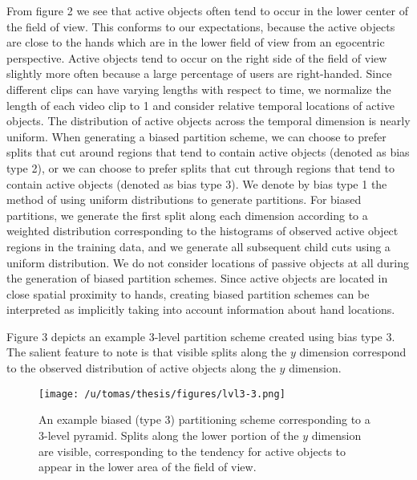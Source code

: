 \documentclass{bmvc2k}
\begin{document}
	From figure 2 we see that active objects often tend to occur in the lower center
	of the field of view. This conforms to our expectations, because
	the active objects are close to the hands which are in the lower field of
	view from an egocentric perspective. Active objects tend to occur on the
  right side of the field of view slightly more often because a large
  percentage of users are right-handed. Since different clips can have
  varying lengths with respect to time, we normalize the length of each
  video clip to 1 and consider relative temporal locations of active
  objects. The distribution of active objects
  across the temporal dimension is nearly uniform. When generating a biased
	partition scheme, we can choose to prefer splits that cut around regions that tend to
	contain active objects (denoted as bias type 2), or we can choose to prefer 
	splits that cut through regions that tend to contain active objects (denoted as bias type 3). 
	We denote by bias type 1 the method of using uniform
	distributions to generate partitions. For biased partitions, we generate
  the first split along each dimension according to a weighted distribution
  corresponding to the histograms of observed active object regions in the training data,
  and we generate all subsequent child cuts using a uniform distribution.
  We do not consider locations of passive objects at all during the
  generation of biased partition schemes. Since active objects are located
  in close spatial proximity to hands, creating biased partition schemes can
  be interpreted as implicitly taking into account information about hand
  locations.
  
  Figure 3 depicts an example 3-level partition scheme created using bias
  type 3. The salient feature to note is that visible splits along the $y$
  dimension correspond to the observed distribution of active objects along
  the $y$ dimension.
  

  \begin{figure}[t]
    \begin{center}
		 \texttt{[image: /u/tomas/thesis/figures/lvl3-3.png]}
    \end{center}
		   \caption{An example biased (type 3) partitioning scheme corresponding to a 3-level
       pyramid. Splits along the lower portion of the $y$ dimension are
     visible, corresponding to the tendency for active objects to appear in
   the lower area of the field of view.}
			\label{fig:long}
			\label{fig:onecol}
  \end{figure}
	
\end{document}
